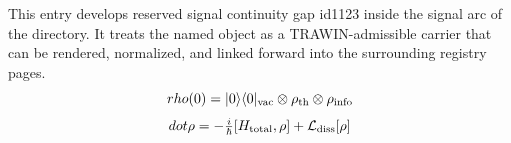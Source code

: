 
\begin{tzpsnapshot}
\end{tzpsnapshot}

This entry develops reserved signal continuity gap id1123 inside the signal arc of the directory. It treats the named object as a TRAWIN-admissible carrier that can be rendered, normalized, and linked forward into the surrounding registry pages.
\[
rho(0)=|0\rangle\langle0|_{\rm vac}\otimes\rho_{\rm th}\otimes\rho_{\rm info}
\]
\[
dot\rho = -\tfrac{i}{\hbar}[H_{\rm total},\rho]+\mathcal L_{\rm diss}[\rho]
\]

